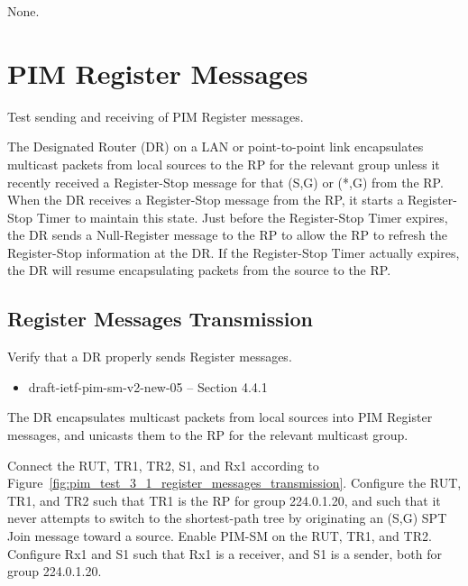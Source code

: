 \documentclass[11pt]{report}
\begin{document}
None.


\chapter{PIM Register Messages}

Test sending and receiving of PIM Register messages.

The Designated Router (DR) on a LAN or point-to-point link encapsulates
multicast packets from local sources to the RP for the relevant group
unless it recently received a Register-Stop message for that (S,G) or
(*,G) from the RP.  When the DR receives a Register-Stop message from
the RP, it starts a Register-Stop Timer to maintain this state.  Just
before the Register-Stop Timer expires, the DR sends a Null-Register
message to the RP to allow the RP to refresh the Register-Stop
information at the DR.  If the Register-Stop Timer actually expires, the
DR will resume encapsulating packets from the source to the RP.

\newpage
\section{Register Messages Transmission}

Verify that a DR properly sends Register messages.

\begin{itemize}
  \item draft-ietf-pim-sm-v2-new-05 -- Section 4.4.1
\end{itemize}

The DR encapsulates multicast packets from local sources into PIM Register
messages, and unicasts them to the RP for the relevant multicast group.

Connect the RUT, TR1, TR2, S1, and Rx1 according to
Figure~\ref{fig:pim_test_3_1_register_messages_transmission}.
Configure the RUT, TR1, and TR2 such that TR1 is the RP for group 224.0.1.20,
and such that it never attempts to switch to the shortest-path tree by
originating an (S,G) SPT Join message toward a source.
Enable PIM-SM on the RUT, TR1, and TR2.
Configure Rx1 and S1 such that Rx1 is a receiver, and S1 is a sender,
both for group 224.0.1.20.
\end{document}
